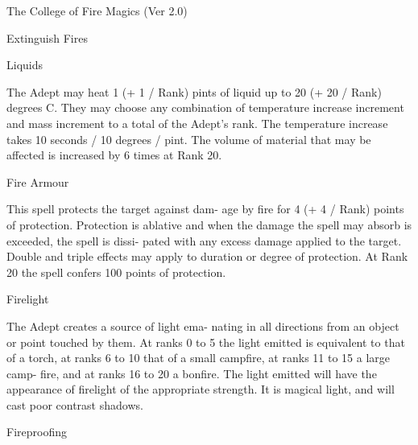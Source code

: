 \begin{Chapter}{The College of Fire Magics (Ver 2.0)}
\begin{spell}[G-2]{Extinguish Fires }
\begin{effects}
Liquids 


The Adept may heat 1 (+ 1 / Rank) pints of liquid 
up  to  20  (+  20  /  Rank)  degrees  C.  They  may 
choose  any  combination  of  temperature  increase 
increment  and  mass  increment  to  a  total  of  the 
Adept’s  rank.  The  temperature  increase  takes  10 
seconds / 10 degrees / pint. The volume of material 
that  may  be  affected  is  increased  by  6  times  at 
Rank 20. 


\end{effects}
\end{spell}

\begin{spell}[G-3]{Fire Armour }

\begin{effects}
 This  spell  protects  the  target  against dam-
age by fire for 4 (+ 4 / Rank) points of  protection. 
Protection  is  ablative  and  when  the  damage  the 
spell  may  absorb  is  exceeded,  the  spell  is  dissi-
pated with any excess damage applied to the target. 
Double and triple effects may apply to duration or 
degree  of  protection.  At Rank  20  the  spell  confers 
100 points of protection. 

\end{effects}
\end{spell}

\begin{spell}[G-4]{Firelight }

\begin{effects}
 The  Adept  creates  a  source  of  light  ema-
nating  in  all  directions  from  an  object  or  point 
touched by them. At ranks 0 to 5 the light emitted 
is equivalent to that of a torch, at ranks 6 to 10 that 
of a small campfire, at ranks 11 to 15 a large camp-
fire,  and  at  ranks  16  to  20  a  bonfire.  The  light 
emitted will have the appearance of firelight of the 
appropriate  strength.  It  is  magical  light,  and  will 
cast poor contrast shadows. 

\end{effects}
\end{spell}

\begin{spell}[G-5]{Fireproofing }


\end{spell}
\end{Chapter}

